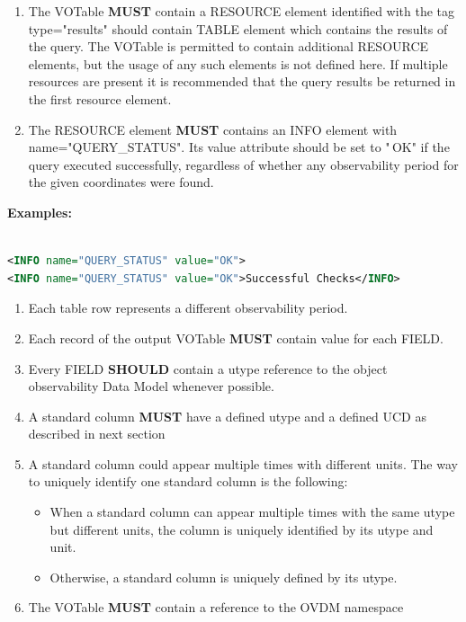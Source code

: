 \documentclass[11pt,a4paper]{ivoatex/ivoa}
\begin{document}
\begin{enumerate}
\item The VOTable \textbf{MUST} contain a RESOURCE element identified
with the tag type="results" should contain TABLE element which contains
the results of the query. The VOTable is permitted to contain additional
RESOURCE elements, but the usage of any such elements is not defined
here. If multiple resources are present it is recommended that the query
results be returned in the first resource element.
\item The RESOURCE element \textbf{MUST} contains an INFO element with
name="QUERY\_STATUS". Its value attribute should be set to "\,OK" if the
query executed successfully, regardless of whether any observability period
for the given coordinates were found.
\setcounter{numberedCntBI}{\theenumi}
\end{enumerate}

\textbf{Examples: }
\begin{lstlisting}[language=XML]

<INFO name="QUERY_STATUS" value="OK">
<INFO name="QUERY_STATUS" value="OK">Successful Checks</INFO>
\end{lstlisting}

\begin{enumerate}
\setcounter{enumi}{\thenumberedCntBI}
\item Each table row represents a different observability period.
\item Each record of the output VOTable \textbf{MUST} contain value
for each FIELD.
\item Every FIELD \textbf{SHOULD} contain a utype reference to the
object observability Data Model whenever possible.
\item A standard column \textbf{MUST} have a defined utype and a
defined UCD as described in next section
\item A standard column could appear multiple times with different
units. The way to uniquely identify one standard column is the
following:
\begin{itemize}
\item When a standard column can appear multiple times with the same
utype but different units, the column is uniquely identified by its
utype and unit.
\item Otherwise, a standard column is uniquely defined by its utype.
\end{itemize}
\item The VOTable \textbf{MUST} contain a reference to the OVDM
namespace
\setcounter{numberedCntBI}{\theenumi}
\end{enumerate}
\end{document}
